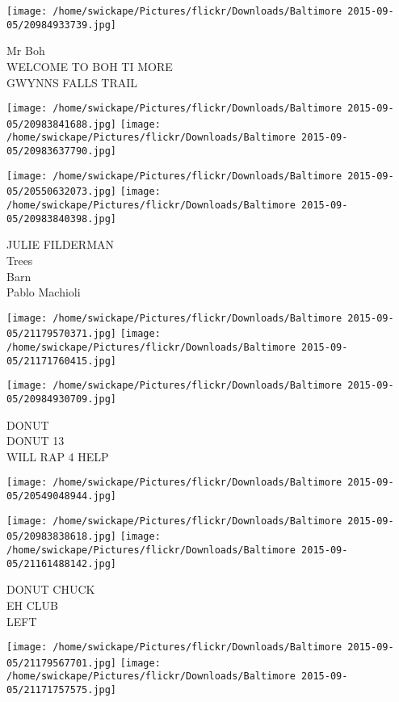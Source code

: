 \documentclass[10pt,letterpaper]{article}
\begin{document}
\vspace{0.25in}
\texttt{[image: /home/swickape/Pictures/flickr/Downloads/Baltimore 2015-09-05/20984933739.jpg]}

Mr Boh\\
WELCOME TO BOH TI MORE\\
GWYNNS FALLS TRAIL\\
\pagebreak

\texttt{[image: /home/swickape/Pictures/flickr/Downloads/Baltimore 2015-09-05/20983841688.jpg]}
\texttt{[image: /home/swickape/Pictures/flickr/Downloads/Baltimore 2015-09-05/20983637790.jpg]}

\texttt{[image: /home/swickape/Pictures/flickr/Downloads/Baltimore 2015-09-05/20550632073.jpg]}
\texttt{[image: /home/swickape/Pictures/flickr/Downloads/Baltimore 2015-09-05/20983840398.jpg]}

JULIE FILDERMAN\\
Trees\\
Barn\\
Pablo Machioli\\
\pagebreak

\texttt{[image: /home/swickape/Pictures/flickr/Downloads/Baltimore 2015-09-05/21179570371.jpg]}
\texttt{[image: /home/swickape/Pictures/flickr/Downloads/Baltimore 2015-09-05/21171760415.jpg]}

\texttt{[image: /home/swickape/Pictures/flickr/Downloads/Baltimore 2015-09-05/20984930709.jpg]}

DONUT\\
DONUT 13\\
WILL RAP 4 HELP\\
\pagebreak

\texttt{[image: /home/swickape/Pictures/flickr/Downloads/Baltimore 2015-09-05/20549048944.jpg]}

\vspace{0.25in}
\texttt{[image: /home/swickape/Pictures/flickr/Downloads/Baltimore 2015-09-05/20983838618.jpg]}
\texttt{[image: /home/swickape/Pictures/flickr/Downloads/Baltimore 2015-09-05/21161488142.jpg]}

DONUT CHUCK\\
EH CLUB\\
LEFT\\
\pagebreak

\texttt{[image: /home/swickape/Pictures/flickr/Downloads/Baltimore 2015-09-05/21179567701.jpg]}
\texttt{[image: /home/swickape/Pictures/flickr/Downloads/Baltimore 2015-09-05/21171757575.jpg]}
\end{document}
